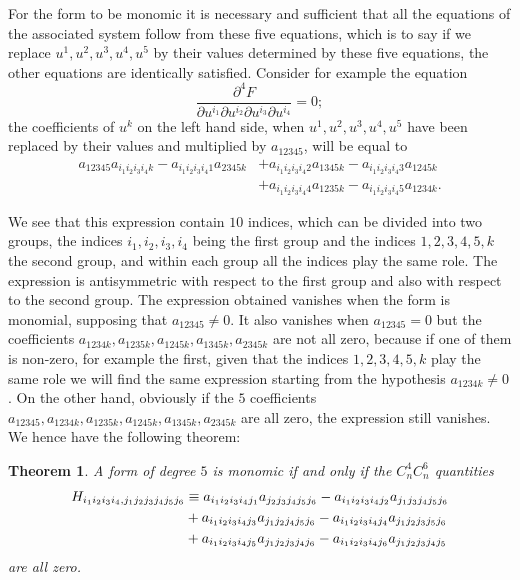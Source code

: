 \documentclass[leqno,11pt]{book}
\numberwithin{equation}{chapter}
\newcommand{\pd}{\partial}
\theoremstyle{shape1}
\newtheorem*{thm*}{\hspace{15pt}Theorem}
\theoremstyle{shape0}
\theoremstyle{shape2}
\theoremstyle{definition}
\begin{document}
For the form to be monomic it is necessary and sufficient that all the equations of the associated system follow from these five equations, which is to say if we replace $u^{1},u^{2},u^{3},u^{4},u^{5}$ by their values determined by these five equations, the other equations are identically satisfied. Consider for example the equation
\[
\frac{\pd ^{4} F}{\pd u^{i_{1}}\pd u^{i_{2}}\pd u^{i_{3}}\pd u^{i_{4}}}=0;
\]
the coefficients of $u^{k}$ on the left hand side, when $u^{1},u^{2},u^{3},u^{4},u^{5}$ have been replaced by their values and  multiplied by $a_{12345}$, will be equal to
\begin{align*}
a_{12345}a_{i_{1}i_{2}i_{3}i_{4}k}-a_{i_{1}i_{2}i_{3}i_{4}1}a_{2345k}&+a_{i_{1}i_{2}i_{3}i_{4}2}a_{1345k}-a_{i_{1}i_{2}i_{3}i_{4}3}a_{1245k}\\
&+a_{i_{1}i_{2}i_{3}i_{4}4}a_{1235k}-a_{i_{1}i_{2}i_{3}i_{4}5}a_{1234k}.
\end{align*}

We see that this expression contain $10$ indices, which can be divided into two groups, the indices $i_{1},i_{2},i_{3},i_{4}$ being the first group and the indices $1,2,3,4,5,k$ the second group, and within each group all the indices play the same role. The expression is antisymmetric with respect to the first group and also  with respect to the second group. The expression obtained vanishes when the form is monomial, supposing that $a_{12345}\neq 0$. It also vanishes when $a_{12345}=0$ but the coefficients $a_{1234k}, a_{1235k},a_{1245k},a_{1345k},a_{2345k}$ are not all zero, because if one of them is non-zero, for example the first, given that the indices $1,2,3,4,5,k$ play the same role we will find the same expression starting from the hypothesis $a_{1234k}\neq0$. On the other hand, obviously  if the $5$ coefficients $a_{12345},a_{1234k},a_{1235k},a_{1245k},a_{1345k},a_{2345k}$ are all zero, the expression still vanishes. We hence have the following theorem:
\begin{thm*}
  A form of degree $5$ is monomic if and only if the $C^{4}_{n}C^{6}_{n}$ quantities
  \begin{align}
    \label{eq:14}
    H_{i_{1}i_{2}i_{3}i_{4},j_{1}j_{2}j_{3}j_{4}j_{5}j_{6}}&\equiv
a_{i_{1}i_{2}i_{3}i_{4}j_{1}}a_{j_{2}j_{3}j_{4}j_{5}j_{6}}
-a_{i_{1}i_{2}i_{3}i_{4}j_{2}}a_{j_{1}j_{3}j_{4}j_{5}j_{6}}\\
&+a_{i_{1}i_{2}i_{3}i_{4}j_{3}}a_{j_{1}j_{2}j_{4}j_{5}j_{6}}
-a_{i_{1}i_{2}i_{3}i_{4}j_{4}}a_{j_{1}j_{2}j_{3}j_{5}j_{6}}\notag\\
&+a_{i_{1}i_{2}i_{3}i_{4}j_{5}}a_{j_{1}j_{2}j_{3}j_{4}j_{6}}
-a_{i_{1}i_{2}i_{3}i_{4}j_{6}}a_{j_{1}j_{2}j_{3}j_{4}j_{5}}\notag
  \end{align}
are all zero.
\end{thm*}
\end{document}
